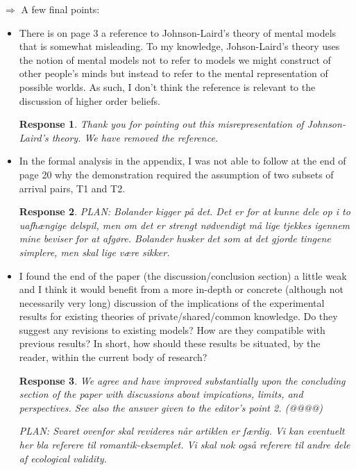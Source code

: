 \documentclass[a4paper]{article}
\newtheorem{response}{Response}
\begin{document}
$\Rightarrow$ A few final points:
\begin{itemize}
\item  There is on page 3 a reference to Johnson-Laird's theory of mental models that is somewhat misleading. To my knowledge, Johson-Laird's theory uses the notion of mental models not to refer to models we might construct of other people's minds but instead to refer to the mental representation of possible worlds. As such, I don't think the reference is relevant to the discussion of higher order beliefs.

\begin{response} Thank you for pointing out this misrepresentation of Johnson-Laird's theory. We have removed the reference.\end{response}
 
\item In the formal analysis in the appendix, I was not able to follow at the end of page 20 why the demonstration required the assumption of two subsets of arrival pairs, T1 and T2.

\begin{response}
PLAN: Bolander kigger på det. Det er for at kunne dele op i to uafhængige delspil, men om det er strengt nødvendigt må lige tjekkes igennem mine beviser for at afgøre. Bolander husker det som at det gjorde tingene simplere, men skal lige være sikker. 
\end{response} 



\item I found the end of the paper (the discussion/conclusion section) a little weak and I think it would benefit from a more in-depth or concrete (although not necessarily very long) discussion of the implications of the experimental results for existing theories of private/shared/common knowledge. Do they suggest any revisions to existing models? How are they compatible with previous results? In short, how should these results be situated, by the reader, within the current body of research?

\begin{response} 
We agree and have improved substantially upon the concluding section of the paper with discussions about impications, limits, and perspectives. See also the answer given to the editor's point 2. (@@@@) 

PLAN: Svaret ovenfor skal revideres når artiklen er færdig. Vi kan eventuelt her bla referere til romantik-eksemplet. Vi skal nok også referere til andre dele af ecological validity.
\end{response}
\end{itemize}
\end{document}
